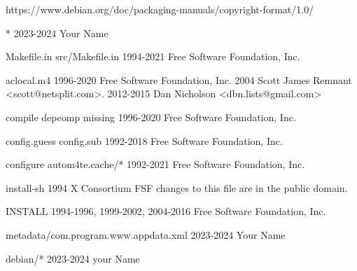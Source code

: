 \begin{script}
 https://www.debian.org/doc/packaging-manuals/copyright-format/1.0/
 
 
 \var{\gitprog}

      *
 2023-2024 Your Name

      Makefile.in
             src/Makefile.in
 1994-2021 Free Software Foundation, Inc.

      aclocal.m4
 1996-2020 Free Software Foundation, Inc.
             2004 Scott James Remnant <scott@netsplit.com>.
             2012-2015 Dan Nicholson <dbn.lists@gmail.com>

      compile
             depcomp
             missing
 1996-2020 Free Software Foundation, Inc.

      config.guess
             config.sub
 1992-2018 Free Software Foundation, Inc.

      configure
             autom4te.cache/*
 1992-2021 Free Software Foundation, Inc.

      install-sh
 1994 X Consortium
    FSF changes to this file are in the public domain.

      INSTALL
 1994-1996, 1999-2002, 2004-2016 Free Software Foundation, Inc.

      metadata/com.program.www.appdata.xml
 2023-2024 Your Name

      debian/*
 2023-2024 your Name
\end{script}

